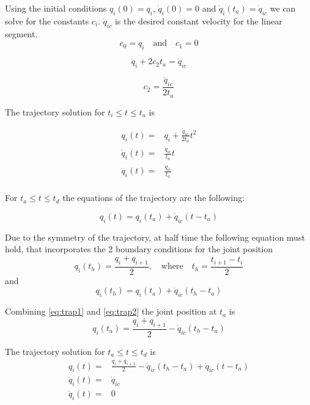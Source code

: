 Using the initial conditions $q_i(0) = q_i$, $\dot{q}_i(0) = 0$ and $\dot{q}_i(t_a) = \dot{q}_{ic}$ we can solve for the constants $c_i$. $\dot{q}_{ic}$ is the desired constant velocity for the linear segment.
\begin{equation}
c_0 = q_i \quad \textrm{and} \quad c_1 = 0
\end{equation}

\[
\dot{q}_i + 2c_2t_a = \dot{q}_{ic}
\]

\begin{equation}
c_2 = \frac{\dot{q}_{ic}}{2t_a}
\end{equation}

The trajectory solution for $t_i \leq t \leq t_a$ is

\begin{equation}
\begin{aligned}
q_i(t) ={}& q_i + \frac{\dot{q}_{ic}}{2t_a}t^2 \\
\dot{q}_i(t) ={}& \frac{\dot{q}_{ic}}{t_a}t \\
\ddot{q}_i(t) ={}& \frac{\dot{q}_{ic}}{t_a} \\
\end{aligned}
\end{equation}

For $t_a \leq t \leq t_d$ the equations of the trajectory are the following:

\begin{equation}
q_i(t) = q_i(t_a) + \dot{q}_{ic}(t-t_a)
\end{equation}

Due to the symmetry of the trajectory, at half time the following equation must hold, that incorporates the 2 boundary conditions for the joint position
\begin{equation}
\label{eq:trap1}
q_i(t_{h}) = \frac{q_i + q_{i+1}}{2}, \quad \textrm{where} \quad t_h = \frac{t_{i+1} - t_i}{2}
\end{equation}
and
\begin{equation}
\label{eq:trap2}
q_i(t_{h}) = q_i(t_a) + \dot{q}_{ic}(t_h - t_a)
\end{equation}

Combining \ref{eq:trap1} and \ref{eq:trap2} the joint position at $t_a$ is
\begin{equation}
q_i(t_a) = \frac{q_i + q_{i+1}}{2} - \dot{q}_{ic}(t_h - t_a)
\end{equation}

The trajectory solution for $t_a \leq t \leq t_d$ is
\begin{equation}
\begin{aligned}
q_i(t) ={}& \frac{q_i + q_{i+1}}{2} - \dot{q}_{ic}(t_h - t_a) + \dot{q}_{ic}(t-t_a) \\
\dot{q}_i(t) ={}& \dot{q}_{ic} \\
\ddot{q}_i(t) ={}& 0 \\
\end{aligned}
\end{equation}

